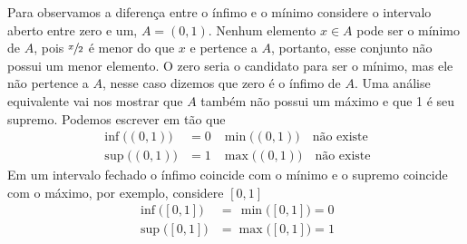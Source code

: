 Para observamos a diferença entre o ínfimo e o mínimo considere
o intervalo aberto entre zero e um, $A=(0, 1)$.
Nenhum elemento $x\in A$ pode ser o mínimo de $A$, pois $\sfrac{x}{2}$
é menor do que $x$ e pertence a $A$, portanto, esse conjunto não possui
um menor elemento. O zero seria o candidato para ser o mínimo, mas
ele não pertence a $A$, nesse caso dizemos que zero é o ínfimo de $A$.
Uma análise equivalente vai nos mostrar que $A$ também não possui um
máximo e que 1 é seu supremo. Podemos escrever em tão que
\begin{align*}
  \inf\big((0, 1)\big) & = 0  &  \min\big((0, 1)\big) \quad \text{não existe} \\
  \sup\big((0, 1)\big) & = 1  &  \max\big((0, 1)\big) \quad \text{não existe}
\end{align*}
Em um intervalo fechado o ínfimo coincide com o mínimo e o supremo
coincide com o máximo, por exemplo, considere $[0, 1]$
\begin{align*}
  \inf\big([0, 1]\big) & = \,\min\big([0, 1]\big) = 0 \\
  \sup\big([0, 1]\big) & =   \max\big([0, 1]\big) = 1
\end{align*}

